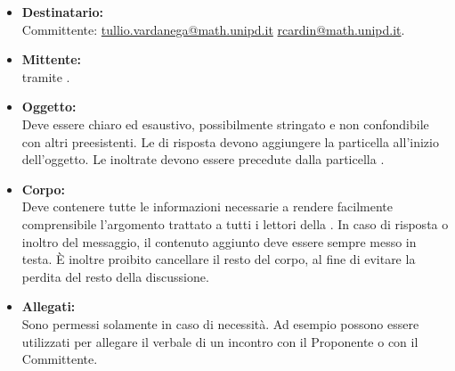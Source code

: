 \begin{itemize}
	\item \textbf{Destinatario:}
	\\Committente: \href{mailto:tullio.vardanega@math.unipd.it}{tullio.vardanega@math.unipd.it}{} \href{mailto:rcardin@math.unipd.it}{rcardin@math.unipd.it}{}.
	\item \textbf{Mittente:}
	\\\Responsabile{} tramite \email{} \href{mailto:\GroupEmail}{\GroupEmail}{}.
	\item \textbf{Oggetto:}
	\\Deve essere chiaro ed esaustivo, possibilmente stringato e non confondibile con altri preesistenti. Le \email{} di risposta devono aggiungere la particella  all’inizio dell’oggetto. Le \email{} inoltrate devono essere precedute dalla particella .
	\item \textbf{Corpo:}
	\\Deve contenere tutte le informazioni necessarie a rendere facilmente comprensibile l’argomento trattato a tutti i lettori della \email{}. In caso di risposta o inoltro del messaggio, il contenuto aggiunto deve essere sempre messo in testa. È inoltre proibito cancellare il resto del corpo, al fine di evitare la perdita del resto della discussione.
	\item \textbf{Allegati:}
	\\Sono permessi solamente in caso di necessità. Ad esempio possono essere utilizzati per allegare il verbale di un incontro con il Proponente o con il Committente.
\end{itemize}

